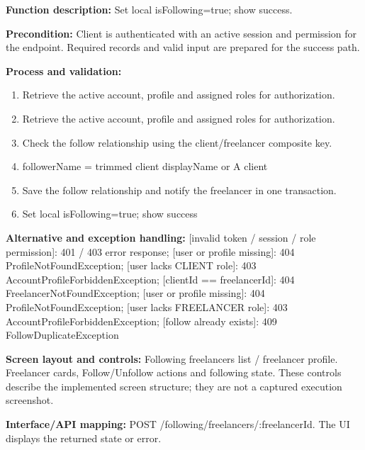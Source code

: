 \textbf{Function description:} Set local is\allowbreak{}Following=\allowbreak{}true; show success.

\textbf{Precondition:} Client is authenticated with an active session and permission for the endpoint. Required records and valid input are prepared for the success path.

\textbf{Process and validation:}
\begin{enumerate}
\item Retrieve the active account, profile and assigned roles for authorization.
\item Retrieve the active account, profile and assigned roles for authorization.
\item Check the follow relationship using the client/\allowbreak{}freelancer composite key.
\item follower\allowbreak{}Name =\allowbreak{} trimmed client display\allowbreak{}Name or A client
\item Save the follow relationship and notify the freelancer in one transaction.
\item Set local is\allowbreak{}Following=\allowbreak{}true; show success
\end{enumerate}
\textbf{Alternative and exception handling:} [invalid token /\allowbreak{} session /\allowbreak{} role permission]: 401 /\allowbreak{} 403 error response; [user or profile missing]: 404 Profile\allowbreak{}Not\allowbreak{}Found\allowbreak{}Exception; [user lacks CLIENT role]: 403 Account\allowbreak{}Profile\allowbreak{}Forbidden\allowbreak{}Exception; [client\allowbreak{}Id =\allowbreak{}=\allowbreak{} freelancer\allowbreak{}Id]: 404 Freelancer\allowbreak{}Not\allowbreak{}Found\allowbreak{}Exception; [user or profile missing]: 404 Profile\allowbreak{}Not\allowbreak{}Found\allowbreak{}Exception; [user lacks FREELANCER role]: 403 Account\allowbreak{}Profile\allowbreak{}Forbidden\allowbreak{}Exception; [follow already exists]: 409 Follow\allowbreak{}Duplicate\allowbreak{}Exception

\textbf{Screen layout and controls:} Following freelancers list /\allowbreak{} freelancer profile. Freelancer cards, Follow/\allowbreak{}Unfollow actions and following state. These controls describe the implemented screen structure; they are not a captured execution screenshot.

\textbf{Interface/\allowbreak{}API mapping:} POST /\allowbreak{}following/\allowbreak{}freelancers/\allowbreak{}:freelancer\allowbreak{}Id. The UI displays the returned state or error.


